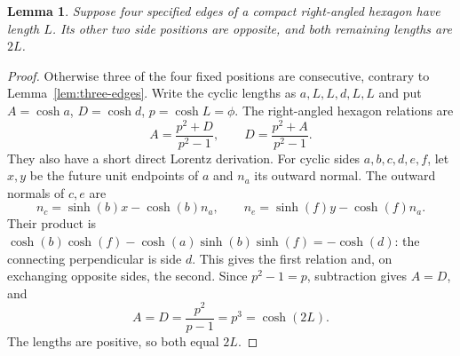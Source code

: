 \documentclass[11pt]{article}
\newtheorem{lemma}[theorem]{Lemma}
\theoremstyle{remark}
\begin{document}
\begin{lemma}\label{lem:hexagon-four}
Suppose four specified edges of a compact right-angled hexagon have
length $L$. Its other two side positions are opposite, and both
remaining lengths are $2L$.
\end{lemma}
\begin{proof}
Otherwise three of the four fixed positions are consecutive, contrary
to Lemma~\ref{lem:three-edges}. Write the cyclic lengths as
$a,L,L,d,L,L$ and put $A=\cosh a$, $D=\cosh d$, $p=\cosh L=\phi$.
The right-angled hexagon relations are
\[
 A=\frac{p^2+D}{p^2-1},\qquad D=\frac{p^2+A}{p^2-1}.
\]
They also have a short direct Lorentz derivation. For cyclic sides
$a,b,c,d,e,f$, let $x,y$ be the future unit endpoints of $a$ and
$n_a$ its outward normal. The outward normals of $c,e$ are
\[
 n_c=\sinh(b)x-\cosh(b)n_a,\qquad
 n_e=\sinh(f)y-\cosh(f)n_a.
\]
Their product is
$\cosh(b)\cosh(f)-\cosh(a)\sinh(b)\sinh(f)=-\cosh(d)$:
the connecting perpendicular is side $d$. This gives the first
relation and, on exchanging opposite sides, the second.
Since $p^2-1=p$, subtraction gives $A=D$, and
\[
 A=D=\frac{p^2}{p-1}=p^3=\cosh(2L).
\]
The lengths are positive, so both equal $2L$.
\end{proof}
\end{document}
